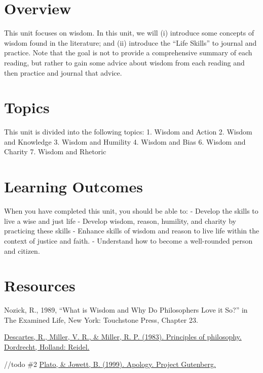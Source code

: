 \documentclass[
]{book}
\begin{document}
\hypertarget{overview}{%
\section{Overview}\label{overview}}

This unit focuses on wisdom. In this unit, we will (i) introduce some concepts of wisdom found in the literature; and (ii) introduce the ``Life Skills'' to journal and practice. Note that the goal is not to provide a comprehensive summary of each reading, but rather to gain some advice about wisdom from each reading and then practice and journal that advice.

\hypertarget{topics}{%
\section{Topics}\label{topics}}

This unit is divided into the following topics:
1. Wisdom and Action
2. Wisdom and Knowledge
3. Wisdom and Humility
4. Wisdom and Bias
6. Wisdom and Charity
7. Wisdom and Rhetoric

\hypertarget{learning-outcomes}{%
\section{Learning Outcomes}\label{learning-outcomes}}

When you have completed this unit, you should be able to:
- Develop the skills to live a wise and just life
- Develop wisdom, reason, humility, and charity by practicing these skills
- Enhance skills of wisdom and reason to live life within the context of justice and faith.
- Understand how to become a well-rounded person and citizen.

\hypertarget{resources}{%
\section{Resources}\label{resources}}

Nozick, R., 1989, ``What is Wisdom and Why Do Philosophers Love it So?'' in The Examined Life, New York: Touchstone Press, Chapter 23.

\href{https://www.earlymoderntexts.com/assets/pdfs/descartes1644part1.pdf}{Descartes, R., Miller, V. R., \& Miller, R. P. (1983). Principles of philosophy. Dordrecht, Holland: Reidel.}

//todo \#2
\href{https://twu.idm.oclc.org/login?url=https://search.ebscohost.com/login.aspx?direct=true\&db=nlebk\&AN=1085368\&site=eds-live\&scope=site\&ebv=EB\&ppid=pp_1}{Plato, \& Jowett, B. (1999). Apology. Project Gutenberg.}
\end{document}
